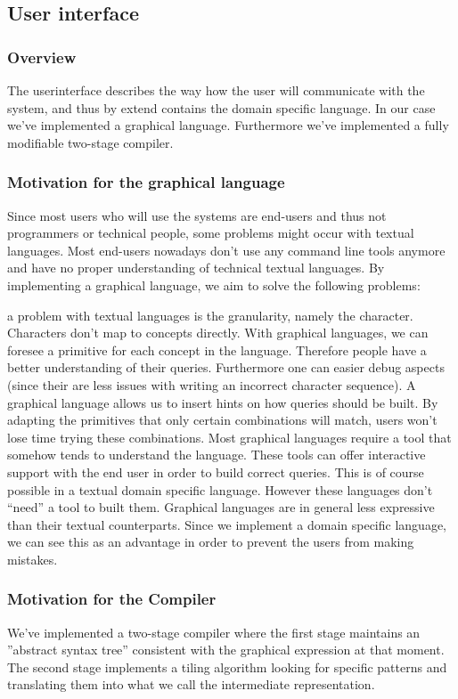 \subsection{User interface}
\subsubsection{Overview}
The userinterface describes the way how the user will communicate with the
system, and thus by extend contains the domain specific language. In our case
we've implemented a graphical language. Furthermore we've implemented a fully
modifiable two-stage compiler.
\subsubsection{Motivation for the graphical language}
Since most users who will use the systems are end-users and thus not
programmers or technical people, some problems might occur with textual
languages. Most end-users nowadays don't use any command line tools anymore and
have no proper understanding of technical textual languages. By implementing a
graphical language, we aim to solve the following problems:
\begin{itemize}
  a problem with textual languages is
the granularity, namely the character. Characters don't map to concepts
directly. With graphical languages, we can foresee a primitive for each concept
in the language. Therefore people have a better understanding of their queries.
Furthermore one can easier debug aspects (since their are less issues with
writing an incorrect character sequence).
  A graphical language allows us to insert
hints on how queries should be built. By adapting the primitives that only
certain combinations will match, users won't lose time trying these
combinations.
Most graphical languages require a tool that somehow
tends to understand the language. These tools can offer interactive support
with the end user in order to build correct queries. This is of course possible
in a textual domain specific language. However these languages don't ``need''
a tool to built them.
Graphical languages are in general less
expressive than their textual counterparts. Since we implement a domain
specific language, we can see this as an advantage in order to prevent the
users from making mistakes.
\end{itemize}
\subsubsection{Motivation for the Compiler}
We've implemented a two-stage compiler where the first stage maintains an
''abstract syntax tree'' consistent with the graphical expression at that
moment. The second stage implements a tiling algorithm looking for specific
patterns and translating them into what we call the intermediate representation.
